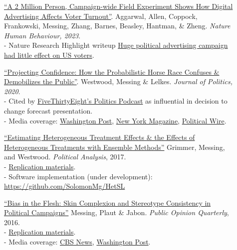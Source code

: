 \documentclass[letterpaper,11pt]{article}
\begin{document}
\begin{description}
\item[] \href{https://www.nature.com/articles/s41562-022-01487-4}{``A 2 Million Person, Campaign-wide Field Experiment Shows How Digital Advertising Affects Voter Turnout''}. Aggarwal, Allen, Coppock, Frankowski, Messing, Zhang, Barnes, Beasley, Hantman, \& Zheng.
\emph{Nature Human Behaviour, 2023}. \\ 
- Nature Research Highlight writeup \href{https://www.nature.com/articles/d41586-023-00073-6}{Huge political advertising campaign had little effect on US voters}.\\


\item[] \href{https://www.journals.uchicago.edu/doi/abs/10.1086/708682}{``Projecting Confidence: How the Probabilistic Horse Race Confuses \& Demobilizes the Public''}. Westwood, Messing \& Lelkes. 
\emph{Journal of Politics, 2020}. \\ 
- Cited by \href{https://web.archive.org/web/20250309064628/https://fivethirtyeight.com/features/politics-podcast-whats-so-wrong-with-nancy-pelosi/}{FiveThirtyEight's Politics Podcast} as influential in decision to change forecast presentation.\\
- Media coverage: \href{https://www.washingtonpost.com/news/politics/wp/2018/02/06/clintons-achilles-heel-in-2016-may-have-been-overconfidence/?utm_term=.b71fb84da00f}{Washington Post},  \href{http://nymag.com/daily/intelligencer/2018/02/americans-dont-understand-election-probabilities.html}{New York Magazine}, \href{https://politicalwire.com/2018/02/06/election-forecasts-lower-voter-turnout/}{Political Wire}.


\item[] \href{https://solomonmg.github.io/pdf/het.pdf}{``Estimating Heterogeneous Treatment Effects \& the Effects of Heterogeneous Treatments with Ensemble Methods''} Grimmer, Messing, and Westwood.
\emph{Political Analysis}, 2017. \\
- \href{http://dx.doi.org/10.7910/DVN/BQMLQW}{Replication materials}. \\
- Software implementation (under development): \url{https://github.com/SolomonMg/HetSL}


\item[] \href{https://www.dropbox.com/s/et4rnj2duzsuhiq/HSVmetricsCampaignsDarknessPOQFINAL.pdf?raw=true}{``Bias in the Flesh: Skin Complexion and Stereotype Consistency in Political Campaigns''} Messing, Plaut \& Jabon.
 \emph{Public Opinion Quarterly}, 2016. \\
- \href{https://dataverse.harvard.edu/dataset.xhtml?persistentId=doi:10.7910/DVN/F0NDJP}{Replication materials}. \\
- Media coverage: \href{http://www.cbsnews.com/news/study-2008-mccain-attack-ads-darkened-obama-skin-tone/}{CBS News}, \href{https://www.washingtonpost.com/news/wonk/wp/2015/12/29/obamas-skin-looks-a-little-different-in-these-gop-campaign-ads/}{Washington Post}.


\end{description}
\end{document}
